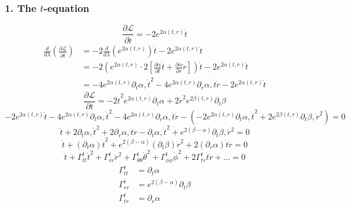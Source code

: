 \documentclass[11pt, a4paper]{report}
\begin{document}
\subsubsection*{1. The $t$-equation}
\begin{equation}
\frac{\partial \mathcal{L}}{\partial \dot{t}} = -2e^{2\alpha(t,r)} \dot{t}
\end{equation}
\begin{align}
\frac{d}{d\lambda} \left( \frac{\partial \mathcal{L}}{\partial \dot{t}} \right) &= -2 \frac{d}{d\lambda} \left( e^{2\alpha(t,r)} \right) \dot{t} - 2e^{2\alpha(t,r)} \ddot{t} \nonumber \\
&= -2 \left( e^{2\alpha(t,r)} \cdot 2 \left[ \frac{\partial \alpha}{\partial t} \dot{t} + \frac{\partial \alpha}{\partial r} \dot{r} \right] \right) \dot{t} - 2e^{2\alpha(t,r)} \ddot{t} \nonumber \\
&= -4e^{2\alpha(t,r)} \partial_t \alpha , \dot{t}^2 - 4e^{2\alpha(t,r)} \partial_r \alpha , \dot{t}\dot{r} - 2e^{2\alpha(t,r)} \ddot{t}
\end{align}
\begin{equation}
\frac{\partial \mathcal{L}}{\partial t} = -2\dot{t}^2 e^{2\alpha(t,r)} \partial_t \alpha + 2\dot{r}^2 e^{2\beta(t,r)} \partial_t \beta
\end{equation}
\begin{equation}
-2e^{2\alpha(t,r)} \ddot{t} - 4e^{2\alpha(t,r)} \partial_t \alpha , \dot{t}^2 - 4e^{2\alpha(t,r)} \partial_r \alpha , \dot{t}\dot{r} - \left( -2e^{2\alpha(t,r)} \partial_t \alpha , \dot{t}^2 + 2e^{2\beta(t,r)} \partial_t \beta , \dot{r}^2 \right) = 0
\end{equation}
\begin{equation}
\ddot{t} + 2\partial_t \alpha , \dot{t}^2 + 2\partial_r \alpha , \dot{t}\dot{r} - \partial_t \alpha , \dot{t}^2 + e^{2(\beta - \alpha)} \partial_t \beta , \dot{r}^2 = 0
\end{equation}
\begin{equation}
\ddot{t} + (\partial_t \alpha) \dot{t}^2 + e^{2(\beta - \alpha)} (\partial_t \beta) \dot{r}^2 + 2 (\partial_r \alpha) \dot{t}\dot{r} = 0 \label{eq:geo_t}
\end{equation}
\begin{equation}
\ddot{t} + \Gamma^t_{tt}\dot{t}^2 + \Gamma^t_{rr}\dot{r}^2 + \Gamma^t_{\theta\theta}\dot{\theta}^2 + \Gamma^t_{\phi\phi}\dot{\phi}^2 + 2\Gamma^t_{tr}\dot{t}\dot{r} + \dots = 0
\end{equation}
\begin{align}
\Gamma^t_{tt} &= \partial_t \alpha \\
\Gamma^t_{rr} &= e^{2(\beta - \alpha)} \partial_t \beta \\
\Gamma^t_{tr} &= \partial_r \alpha
\end{align}
\end{document}
